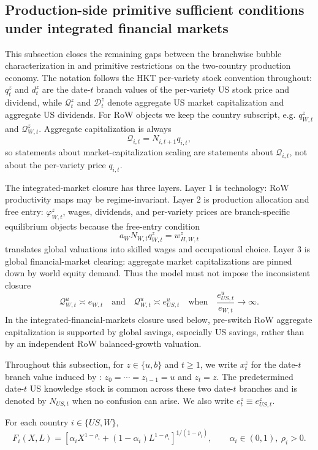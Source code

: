 \documentclass{article}
\begin{document}
\subsection{Production-side primitive sufficient conditions under integrated financial markets}

This subsection closes the remaining gaps between the branchwise bubble characterization in  and primitive restrictions on the two-country production economy. The notation follows the HKT per-variety stock convention throughout: $q_t^z$ and $d_t^z$ are the date-$t$ branch values of the per-variety US stock price and dividend, while $\mathcal Q_t^z$ and $\mathcal D_t^z$ denote aggregate US market capitalization and aggregate US dividends. For RoW objects we keep the country subscript, e.g. $q_{W,t}^z$ and $\mathcal Q_{W,t}^z$. Aggregate capitalization is always
\[
\mathcal Q_{i,t}=N_{i,t+1}q_{i,t},
\]
so statements about market-capitalization scaling are statements about $\mathcal Q_{i,t}$, not about the per-variety price $q_{i,t}$.

The integrated-market closure has three layers. Layer 1 is technology: RoW productivity maps may be regime-invariant. Layer 2 is production allocation and free entry: $\varphi_{W,t}^z$, wages, dividends, and per-variety prices are branch-specific equilibrium objects because the free-entry condition
\[
a_WN_{W,t}q_{W,t}^z=w_{H,W,t}^z
\]
translates global valuations into skilled wages and occupational choice. Layer 3 is global financial-market clearing: aggregate market capitalizations are pinned down by world equity demand. Thus the model must not impose the inconsistent closure
\[
\mathcal Q_{W,t}^u\asymp e_{W,t}
\quad\text{and}\quad
\mathcal Q_{W,t}^u\asymp e_{US,t}^u
\quad\text{when}\quad
\frac{e_{US,t}^u}{e_{W,t}}\to\infty.
\]
In the integrated-financial-markets closure used below, pre-switch RoW aggregate capitalization is supported by global savings, especially US savings, rather than by an independent RoW balanced-growth valuation.

Throughout this subsection, for $z\in\{u,b\}$ and $t\ge 1$, we write $x_t^z$ for the date-$t$ branch value induced by : $z_0=\cdots=z_{t-1}=u$ and $z_t=z$. The predetermined date-$t$ US knowledge stock is common across these two date-$t$ branches and is denoted by $N_{US,t}$ when no confusion can arise. We also write $e_t^z\equiv e_{US,t}^z$.

\begin{ass}\label{ass_ces_two_country}
For each country $i\in\{US,W\}$,
\[
F_i(X,L)=\left[\alpha_i X^{1-\rho_i}+(1-\alpha_i)L^{1-\rho_i}\right]^{1/(1-\rho_i)},
\qquad
\alpha_i\in(0,1),\ \rho_i>0.
\]
\end{ass}
\end{document}
